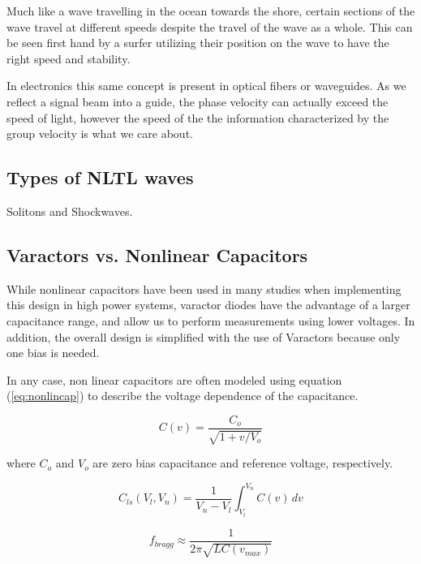 \documentclass[journal]{IEEEtran} \usepackage[english]{babel}
\begin{document}
Much like a wave travelling in the ocean towards the shore, certain sections of
the wave travel at different speeds despite the travel of the wave as a whole.
This can be seen first hand by a surfer utilizing their position on the wave to
have the right speed and stability. 

In electronics this same concept is present in optical fibers or waveguides. As
we reflect a signal beam into a guide, the phase velocity can actually exceed
the speed of light, however the speed of the the information characterized by
the group velocity is what we care about. 



\subsection{Types of NLTL waves}
Solitons and Shockwaves.

\subsection{Varactors vs. Nonlinear Capacitors}

While nonlinear capacitors have been used in many studies
\cite{FastHighVoltageNLTL} when implementing this design in high power systems,
varactor diodes have the advantage of a larger capacitance range, and allow us
to perform measurements using lower voltages. In addition, the overall design is
simplified with the use of Varactors because only one bias is needed.

In any case, non linear capacitors are often modeled using equation
(\ref{eq:nonlincap}) to describe the voltage dependence of the
capacitance\cite{nikoo2018theory}.


\begin{equation}\label{eq:nonlincap}
C(v) = \frac{C_{o}}{\sqrt{1+v/V_{o}}}
\end{equation}


where $C_{o}$ and $V_{o}$ are zero bias capacitance and reference voltage,
respectively.

\begin{equation}\label{eq:LargeSignalDiodeCap}
C_{ls}(V_{l},V_{n}) = \frac{1}{V_{n}-V_{l}}\int_{V_{l}}^{V_{n}}C(v)\, dv
\end{equation}

\begin{equation}\label{eq:bragg}
	f_{bragg} \approx \frac{1}{2\pi{}\sqrt{LC(v_{max})}}	
\end{equation}
\end{document}

